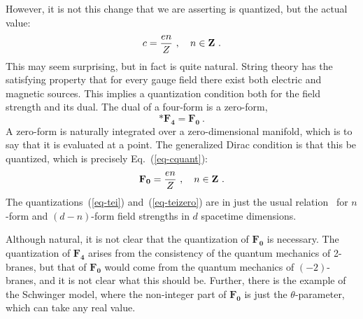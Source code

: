 \documentclass[12pt]{article}
\begin{document}
However, it is not this change that we are asserting is quantized, but
the actual value:
\begin{equation}
c = \frac{en}{Z} \ ,\quad n \in {\bf Z}\ . \label{eq-cquant}
\end{equation}
This may seem surprising, but in fact is quite natural.  String theory
has the satisfying property that for every gauge field there exist
both electric and magnetic sources.  This implies a quantization
condition both for the field strength and its dual.  The dual of a
four-form is a zero-form,
\begin{equation}
*\mathbf{F_{4}} = \mathbf{F_{0}}\ .
\end{equation}
A zero-form is naturally integrated over a zero-dimensional manifold,
which is to say that it is evaluated at a point.  The generalized
Dirac condition is that this be quantized, which is precisely
Eq.~(\ref{eq-cquant}):
\begin{equation}
\mathbf{F_{0}} = \frac{en}{Z}\ ,\quad n \in {\bf Z}\ .
\label{eq-teizero}
\end{equation}
The quantizations~(\ref{eq-tei}) and~(\ref{eq-teizero}) are in just
the usual relation~\cite{Tei86} for $n$-form and $(d-n)$-form field
strengths in $d$ spacetime dimensions.

Although natural, it is not clear that the quantization of
$\mathbf{F_{0}}$ is necessary.  The quantization of $\mathbf{F_{4}}$
arises from the consistency of the quantum mechanics of 2-branes, but
that of $\mathbf{F_{0}}$ would come from the quantum mechanics of
$(-2)$-branes, and it is not clear what this should be.  Further,
there is the example of the Schwinger model, where the non-integer
part of $\mathbf{F_{0}}$ is just the $\theta$-parameter, which can
take any real value.
\end{document}
